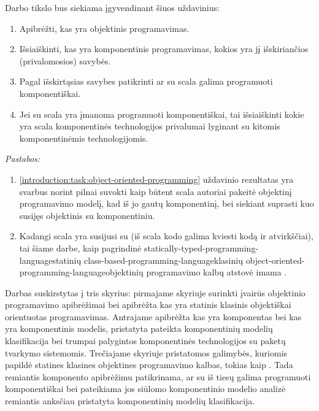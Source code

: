 Darbo tikslo bus siekiama įgyvendinant šiuos uždavinius:
\begin{enumerate}
  \item \label{introduction:task:object-oriented-programming}
    Apibrėžti, kas yra objektinis programavimas.
  \item Išsiaiškinti, kas yra komponentinis programavimas, kokios
    yra jį išskiriančios (privalomosios) savybės.
  \item Pagal išskirtąsias savybes patikrinti ar su
    \gls{scala}{} galima programuoti komponentiškai.
  \item Jei su \gls{scala}{} yra įmanoma programuoti
    komponentiškai, tai išsiaiškinti kokie yra
    \gls{scala}{} komponentinės technologijos
    privalumai lyginant su kitomis komponentinėmis technologijomis.
\end{enumerate}
\emph{Pastabos:}
\begin{enumerate}
  \item \ref{introduction:task:object-oriented-programming}
    uždavinio rezultatas yra svarbus norint pilnai suvokti kaip būtent
    \gls{scala}{} autoriai pakeitė objektinį programavimo
    modelį, kad iš jo gautų komponentinį, bei siekiant suprasti kuo
    susijęs objektinis su komponentiniu.
  \item Kadangi \gls{scala}{} yra susijusi su
     (iš \gls{scala}{} kodo galima
    kviesti  kodą ir atvirkščiai), tai šiame darbe,
    kaip pagrindinė \gls{statically-typed-programming-language}{statinių}
    \gls{class-based-programming-language}{klasinių}
    \gls{object-oriented-programming-language}{objektinių}
    programavimo kalbų atstovė imama .
\end{enumerate}

Darbas suskirstytas į tris skyrius: pirmajame skyriuje surinkti
įvairūs objektinio programavimo apibrėžimai bei apibrėžta kas
yra statinis klasinis objektiškai orientuotas programavimas.
Antrajame apibrėžta kas yra komponentas bei kas yra komponentinis
modelis, pristatyta \cite{classification-framework-for-scm} pateikta
komponentinių modelių klasifikacija bei trumpai palygintos
komponentinės technologijos su paketų tvarkymo sistemomis.
Trečiajame skyriuje pristatomos galimybės, kuriomis 
papildė statines klasines objektines programavimo kalbas, tokias
kaip . Tada remiantis komponento apibrėžimu patikrinama, ar
su  iš tiesų galima programuoti komponentiškai bei
pateikiama jos siūlomo komponentinio modelio analizė remiantis
anksčiau pristatyta komponentinių modelių klasifikacija.
